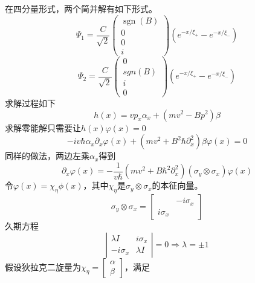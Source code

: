 \documentclass{article}
\numberwithin{equation}{subsection}
\begin{document}
在四分量形式，两个简并解有如下形式。
\begin{equation}
    \Psi_{1}=\frac{C}{\sqrt{2}}\left(\begin{array}{c}
        \operatorname{sgn}(B) \\
        0 \\
        0 \\
        i
        \end{array}\right)\left(e^{-x / \xi_{+}}-e^{-x / \xi_{-}}\right)
\end{equation}
\begin{equation}
    \Psi_{2}=\frac{C}{\sqrt{2}}\left(\begin{array}{c}
        0 \\
        s g n(B) \\
        i \\
        0
        \end{array}\right)\left(e^{-x / \xi_{+}}-e^{-x / \xi_{-}}\right)
\end{equation}
求解过程如下
\begin{equation}
    h(x)=vp_x\alpha_x+(mv^2-Bp^2)\beta
\end{equation}
求解零能解只需要让$h(x)\varphi(x)=0$
\begin{equation}
    -iv\hbar\alpha_x\partial_x\varphi(x)+(mv^2+B^2\hbar\partial_x^2)\beta\varphi(x)=0
\end{equation}
同样的做法，两边左乘$\alpha_x$得到
\begin{equation}
    \partial_x\varphi(x)=-\frac{1}{v\hbar}(mv^2+B\hbar^2\partial_x^2)(\sigma_y\otimes\sigma_x)\varphi(x)
\end{equation}
令$\varphi(x)=\chi_\eta\phi(x)$，其中$\chi_\eta$是$\sigma_y\otimes\sigma_x$的本征向量。
\begin{equation}
    \sigma_y\otimes\sigma_x=\begin{bmatrix}
        \quad&-i\sigma_x\\
        i\sigma_x&\quad
    \end{bmatrix}
\end{equation}
久期方程
\begin{equation}
    \left|\begin{matrix}
        \lambda I&i\sigma_x\\
        -i\sigma_x&\lambda I
    \end{matrix}\right|=0\Longrightarrow\lambda=\pm1
\end{equation}
假设狄拉克二旋量为$\chi_\eta=\begin{bmatrix}
    \alpha\\
    \beta
\end{bmatrix}$，满足
\end{document}
